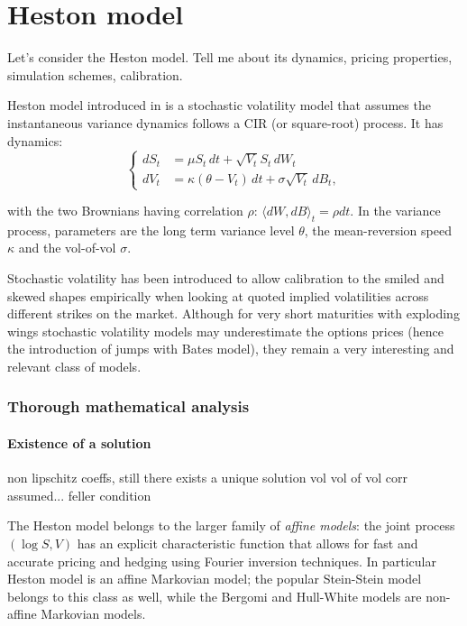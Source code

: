 \section{Heston model}

\begin{tcolorbox}[width=\linewidth, sharp corners=all, colback=white!95!black]
    Let's consider the Heston model. Tell me about its dynamics, pricing properties, simulation schemes, calibration.

\end{tcolorbox}

Heston model introduced in \cite{heston1993closed} is a stochastic volatility model that assumes the instantaneous variance dynamics follows a CIR (or square-root) process. It has dynamics:
\begin{equation*}
    \left\{
    \begin{aligned}
        dS_t &= \mu S_t \, dt + \sqrt{V_t}S_t \, dW_t \\
        dV_t &= \kappa (\theta - V_t) \, dt + \sigma \sqrt{V_t} \, dB_t,
    \end{aligned}
    \right.
\end{equation*}

with the two Brownians having correlation $\rho$: $\langle dW, dB \rangle_t = \rho dt.$ In the variance process, parameters are the long term variance level $\theta$, the mean-reversion speed $\kappa$  and the vol-of-vol $\sigma$.

Stochastic volatility has been introduced to allow calibration to the smiled and skewed shapes empirically when looking at quoted implied volatilities across different strikes on the market. Although for very short maturities with exploding wings stochastic volatility models may underestimate the options prices (hence the introduction of jumps with Bates model), they remain a very interesting and relevant class of models.

\subsubsection*{Thorough mathematical analysis}

\paragraph*{Existence of a solution}
non lipschitz coeffs, still there exists a unique solution
vol vol of vol corr assumed... 
feller condition

The Heston model belongs to the larger family of \textit{affine models}: the joint process $(\log S, V)$ has an explicit characteristic function that allows for fast and accurate pricing and hedging using Fourier inversion techniques. In  particular Heston model is an affine Markovian model; the popular Stein-Stein model belongs to this class as well, while the Bergomi and Hull-White models are non-affine Markovian models. 




